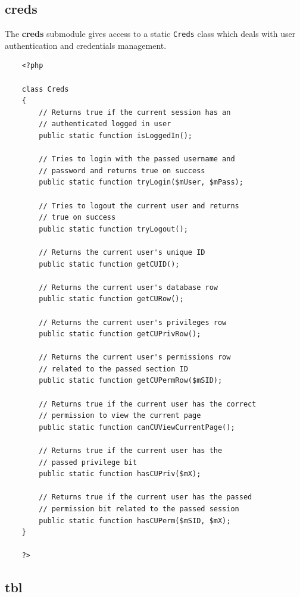 \documentclass[12pt]{report}
\renewcommand\emph{\textbf}
\begin{document}
                \subsection{creds}

                    The \emph{creds} submodule gives access to a static \texttt{Creds} class which deals with user authentication and credentials management.

                    \begin{verbatim}
    <?php

    class Creds
    {
        // Returns true if the current session has an
        // authenticated logged in user
        public static function isLoggedIn();

        // Tries to login with the passed username and
        // password and returns true on success
        public static function tryLogin($mUser, $mPass);

        // Tries to logout the current user and returns
        // true on success
        public static function tryLogout();

        // Returns the current user's unique ID
        public static function getCUID();

        // Returns the current user's database row
        public static function getCURow();

        // Returns the current user's privileges row
        public static function getCUPrivRow();

        // Returns the current user's permissions row
        // related to the passed section ID
        public static function getCUPermRow($mSID);

        // Returns true if the current user has the correct
        // permission to view the current page
        public static function canCUViewCurrentPage();

        // Returns true if the current user has the 
        // passed privilege bit
        public static function hasCUPriv($mX);

        // Returns true if the current user has the passed
        // permission bit related to the passed session
        public static function hasCUPerm($mSID, $mX);
    }

    ?>                  
                \end{verbatim}

                \subsection{tbl}
\end{document}
